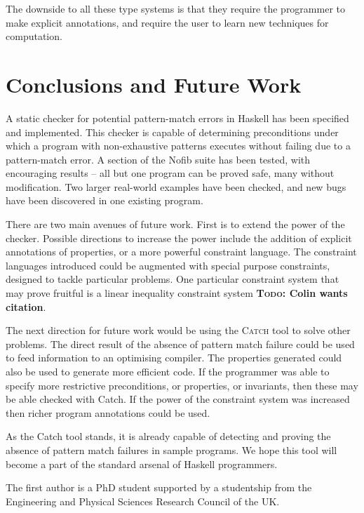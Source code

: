 \documentclass[preprint]{sigplanconf}
\newcommand{\catch}{\textsc{Catch}}
\newcommand{\todo}[1]{\textbf{\textsc{Todo:} #1}}
\begin{document}
The downside to all these type systems is that they require the programmer to make explicit annotations, and require the user to learn new techniques for computation.


\section{Conclusions and Future Work}
\label{sec:conclusion}

A static checker for potential pattern-match errors in Haskell has been specified and implemented. This checker is capable of determining preconditions under which a program with non-exhaustive patterns executes without failing due to a pattern-match error. A section of the Nofib suite has been tested, with encouraging results -- all but one program can be proved safe, many without modification. Two larger real-world examples have been checked, and new bugs have been discovered in one existing program.

There are two main avenues of future work. First is to extend the power of the checker. Possible directions to increase the power include the addition of explicit annotations of properties, or a more powerful constraint language. The constraint languages introduced could be augmented with special purpose constraints, designed to tackle particular problems. One particular constraint system that may prove fruitful is a linear inequality constraint system \todo{Colin wants citation}.

The next direction for future work would be using the \catch{} tool to solve other problems. The direct result of the absence of pattern match failure could be used to feed information to an optimising compiler. The properties generated could also be used to generate more efficient code. If the programmer was able to specify more restrictive preconditions, or properties, or invariants, then these may be able checked with Catch. If the power of the constraint system was increased then richer program annotations could be used.

As the Catch tool stands, it is already capable of detecting and proving the absence of pattern match failures in sample programs. We hope this tool will become a part of the standard arsenal of Haskell programmers.


%

\acks

The first author is a PhD student supported by a studentship from the Engineering and Physical Sciences Research Council of the UK.



\end{document}
